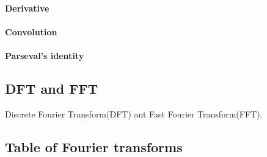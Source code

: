 \paragraph{Derivative}
\paragraph{Convolution}


\paragraph{Parseval's identity}


\subsection{DFT and FFT}
Discrete Fourier Transform(DFT) ant Fast Fourier Transform(FFT).

\subsection{Table of Fourier transforms}

